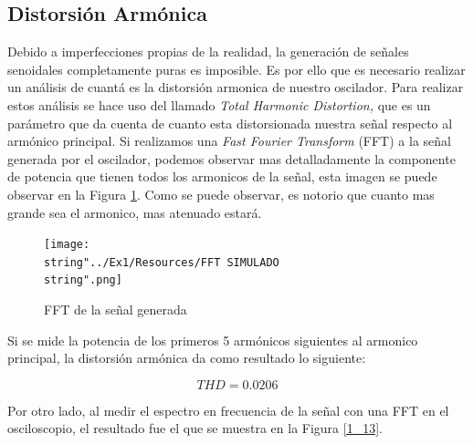 \subsection{Distorsión Armónica}

Debido a imperfecciones propias de la realidad, la generación de señales
senoidales completamente puras es imposible. Es por ello que es necesario
realizar un análisis de cuantá es la distorsión armonica de nuestro
oscilador. Para realizar estos análisis se hace uso del llamado \emph{Total
Harmonic Distortion, }que es un parámetro que da cuenta de cuanto
esta distorsionada nuestra señal respecto al armónico principal. Si
realizamos una \emph{Fast Fourier Transform} (FFT) a la señal generada
por el oscilador, podemos observar mas detalladamente la componente
de potencia que tienen todos los armonicos de la señal, esta imagen
se puede observar en la Figura \ref{1_12}. Como se puede observar,
es notorio que cuanto mas grande sea el armonico, mas atenuado estará.

\begin{figure}[h]
\begin{centering}
\texttt{[image: \\string"../Ex1/Resources/FFT SIMULADO\\string".png]}
\par\end{centering}
\caption{FFT de la señal generada}
\label{1_12}

\end{figure}

Si se mide la potencia de los primeros 5 armónicos siguientes al armonico
principal, la distorsión armónica da como resultado lo siguiente:

\[
THD=0.0206
\]

Por otro lado, al medir el espectro en frecuencia de la señal con
una FFT en el osciloscopio, el resultado fue el que se muestra en
la Figura \ref{1_13}.

